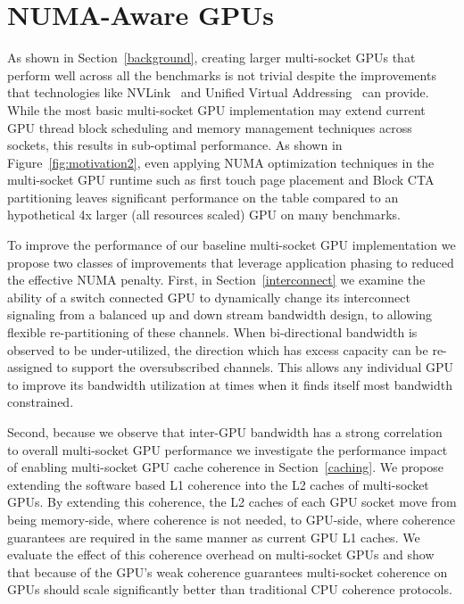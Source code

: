 \section{NUMA-Aware GPUs}

As shown in Section~\ref{background}, creating larger multi-socket GPUs that 
perform well across all the benchmarks is not trivial despite the 
improvements that technologies like NVLink~\cite{NVLINK} and Unified Virtual 
Addressing~\cite{UVM} can provide. While the most basic multi-socket GPU 
implementation may extend current GPU thread block scheduling and memory 
management techniques across sockets, this results in sub-optimal 
performance.  As shown in Figure~\ref{fig:motivation2}, even applying NUMA 
optimization techniques in the multi-socket GPU runtime such as first touch 
page placement and Block CTA partitioning leaves significant performance on 
the table compared to an hypothetical 4x larger (all resources scaled) GPU on many 
benchmarks.

To improve the performance of our baseline multi-socket GPU implementation we 
propose two classes of improvements that leverage application phasing to reduced 
the effective NUMA penalty.  First, in 
Section~\ref{interconnect} we examine the ability of a switch connected GPU to 
dynamically change its interconnect signaling from a balanced up and down 
stream bandwidth design, to allowing flexible re-partitioning of these channels.  
When bi-directional bandwidth is observed to be under-utilized, the direction 
which has excess capacity can be re-assigned to support the oversubscribed 
channels. This allows any individual GPU to improve its bandwidth utilization at 
times when it finds itself most bandwidth constrained.

Second, because we observe that inter-GPU bandwidth has a strong correlation to 
overall multi-socket GPU performance we investigate the performance impact of 
enabling multi-socket GPU cache coherence in Section~\ref{caching}.  We propose 
extending the software based L1 coherence into the L2 caches of multi-socket 
GPUs.  By extending this coherence, the L2 caches of each GPU socket move from 
being memory-side, where coherence is not needed, to GPU-side, where coherence 
guarantees are required in the same manner as current GPU L1 caches.  We 
evaluate the effect of this coherence overhead on multi-socket GPUs and show 
that because of the GPU's weak coherence guarantees multi-socket coherence on 
GPUs should scale significantly better than traditional CPU coherence protocols.

